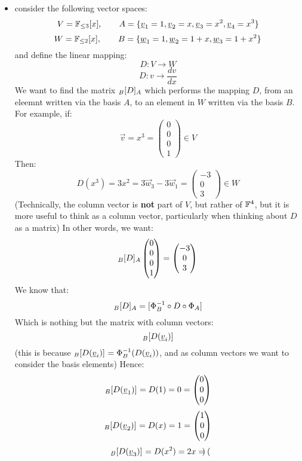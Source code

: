 \documentclass{exam}
\begin{document}
\begin{itemize}
\item consider the following vector spaces:
\[
V = \F_{\leq 3}[x], \qquad A = \{\vec{v}_1 = 1, \vec{v}_2 = x, \vec{v}_3 = x^2, \vec{v}_4 = x^3\}
\]
\[
W = \F_{\leq 2}[x], \qquad B = \{\vec{w}_1 = 1, \vec{w}_2 = 1 + x, \vec{w}_3 = 1 + x^2\}
\]
and define the linear mapping:
\[
D : V \to W
\]
\[
D : v \to \frac{dv}{dx}
\]
We want to find the matrix $\cript{D}{B}{A}$ which performs the mapping $D$, from an eleemnt written via the basis $A$, to an element in $W$ written via the basis $B$. For example, if:
\[
\vec{v} = x^3 = \begin{pmatrix}
0 \\
0 \\
0 \\
1
\end{pmatrix} \in V
\]
Then:
\[
D(x^3) = 3x^2 = 3\vec{w}_3 - 3\vec{w}_1 = \begin{pmatrix}
-3 \\
0 \\
3
\end{pmatrix}\in W
\]
(Technically, the column vector is \textbf{not} part of $V$, but rather of $\F^4$, but it is more useful to think as a column vector, particularly when thinking about $D$ as a matrix)
In other words, we want:
\[
\cript{D}{B}{A} \begin{pmatrix}
0 \\
0 \\
0 \\
1
\end{pmatrix} 
=\begin{pmatrix}
-3 \\
0 \\
3
\end{pmatrix}
\]
We know that:
\[
\cript{D}{B}{A} = [\Phi_B^{-1} \circ D \circ \Phi_A]
\]
Which is nothing but the matrix with column vectors:
\[
\cript{D(\vec{v}_i)}{B}{}
\]
(this is because $\cript{D(\vec{v}_i)}{B}{} = \Phi_B^{-1}(D(\vec{v}_i))$, and as column vectors we want to consider the basis elements)
Hence:
\[
\cript{D(\vec{v}_1)}{B}{} = D(1) = 0 = \begin{pmatrix}
0 \\
0 \\
0 
\end{pmatrix}
\]
\[
\cript{D(\vec{v}_2)}{B}{} = D(x) = 1 = \begin{pmatrix}
1 \\
0 \\
0 
\end{pmatrix}
\]
\[
\cript{D(\vec{v}_3)}{B}{} = D(x^2) = 2x = \begin{pmatrix}

\end{pmatrix}\]
\end{itemize}
\end{document}
